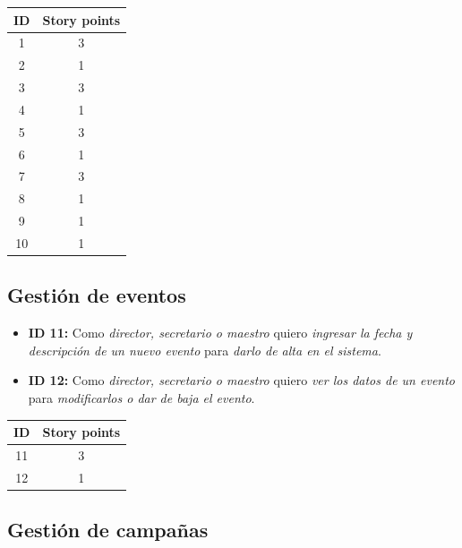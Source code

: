 \documentclass[a4paper, 10pt, twoside]{article}
\newenvironment{stories}{
  \begin{itemize}
}{
  \end{itemize}
}
\newcommand{\story}[4]{
  \item
  \textbf{ID #1:} Como \emph{#2} quiero \emph{#3} para \emph{#4}.
}
\begin{document}
\begin{center}
\begin{tabular}{|c|c|}
\hline
ID & Story points\\
\hline
1  & 3\\
2  & 1\\
3  & 3\\
4  & 1\\
5  & 3\\
6  & 1\\
7  & 3\\
8  & 1\\
9  & 1\\
10 & 1\\
\hline
\end{tabular}
\end{center}


\subsection{Gestión de eventos}

\begin{stories}
  \story{11}{director, secretario o maestro}
        {ingresar la fecha y descripción de un nuevo evento}
        {darlo de alta en el sistema}

  \story{12}{director, secretario o maestro}
        {ver los datos de un evento}
        {modificarlos o dar de baja el evento}
\end{stories}

\begin{center}
\begin{tabular}{|c|c|}
\hline
ID & Story points\\
\hline
11 & 3\\
12 & 1\\
\hline
\end{tabular}
\end{center}


\subsection{Gestión de campañas}
\end{document}
